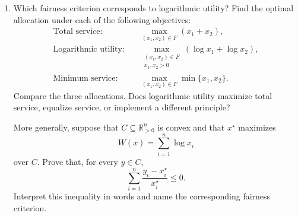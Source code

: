 \documentclass[11pt]{article}
\begin{document}
\begin{enumerate}[label=\arabic*., leftmargin=1.6em]
\begin{enumerate}
\textbf{Solution.}
\(u'(x)>0\) means more service is strictly better. \(u''(x)<0\) means marginal utility is strictly decreasing: the curve is strictly concave and becomes flatter as service increases.
\begin{center}
\end{center}
Let \(g(\delta)=u(a+\delta)+u(b-\delta)\). Then \(g'(\delta)=u'(a+\delta)-u'(b-\delta)\). For \(0<\delta<(b-a)/2\), one has \(a+\delta<b-\delta\). Since \(u'\) is strictly decreasing, \(g'(\delta)>0\), so \(g(\delta)>g(0)\).

This does not force equal service rates. The transfer above moves one unit of service from one user to the other. Under \(x_{1}+2x_{2}\le 12\), that transfer need not be feasible: user 2 consumes twice as much resource per unit of service. For instance \((6,3)\) is feasible, but \((5,4)\) uses resource \(5+8=13>12\). The feasible equal-rate point is \((4,4)\), and
\[
\log 4+\log 4=\log 16<\log 18=\log 6+\log 3.
\]
Strict concavity favors equalizing marginal utilities per unit of scarce resource, not the service rates themselves.

\item Which fairness criterion corresponds to logarithmic utility? Find the optimal
allocation under each of the following objectives:
\begin{align*}
\text{Total service:} &\quad
\max_{(x_{1},x_{2})\in F}(x_{1}+x_{2}), \\[0.4em]
\text{Logarithmic utility:} &\quad
\max_{\substack{(x_{1},x_{2})\in F \\ x_{1},x_{2}>0}}(\log x_{1}+\log x_{2}), \\[0.4em]
\text{Minimum service:} &\quad
\max_{(x_{1},x_{2})\in F}\min\{x_{1},x_{2}\}.
\end{align*}
Compare the three allocations. Does logarithmic utility maximize total service,
equalize service, or implement a different principle?

More generally, suppose that $C\subseteq\mathbb{R}^{n}_{>0}$ is convex and that $x^{\star}$ maximizes
\[
W(x)=\sum_{i=1}^{n}\log x_{i}
\]
over $C$. Prove that, for every $y\in C$,
\[
\sum_{i=1}^{n}\frac{y_{i}-x^{\star}_{i}}{x^{\star}_{i}}\le 0.
\]
Interpret this inequality in words and name the corresponding fairness criterion.


\end{enumerate}
\end{enumerate}
\end{document}
